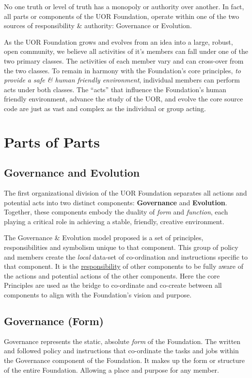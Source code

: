 \documentclass[twocolumn,10pt]{article}
\begin{document}
No one truth or level of truth has a monopoly or authority over another.
In fact, all parts or components of the UOR Foundation, operate within one of the two sources of responsibility \& authority:
Governance or Evolution.

As the UOR Foundation grows and evolves from an idea into a large, robust, open community, we believe all activities of it's members can fall under one of the two primary classes.
The activities of each member vary and can cross-over from the two classes.
To remain in harmony with the Foundation's core principles, \textit{to provide a safe \& human friendly environment}, individual members can perform acts under both classes.
The ``acts'' that influence the Foundation's human friendly environment, advance the study of the UOR, and evolve the core source code are just as vast and complex as the individual or group acting.

\section*{Parts of Parts}
\subsection*{Governance and Evolution}
The first organizational division of the UOR Foundation separates all actions and potential acts into two distinct components: \textbf{Governance} and \textbf{Evolution}.
Together, these components embody the duality of \textit{form} and \textit{function}, each playing a critical role in achieving a stable, friendly, creative environment.

The Governance \& Evolution model proposed is a set of principles, responsibilities and symbolism unique to that component.
This group of policy and members create the \textit{local} data-set of co-ordination and instructions specific to that component.
It is the \underline{responsibility} of other components to be fully aware of the actions and potential actions of the other components.
Here the core Principles are used as the bridge to co-ordinate and co-create between all components to align with the Foundation's vision and purpose.

\subsection*{Governance (Form)}
Governance represents the static, absolute \textit{form} of the Foundation.
The written and followed policy and instructions that co-ordinate the tasks and jobs within the Governance component of the Foundation.
It makes up the form or structure of the entire Foundation.
Allowing a place and purpose for any member.
\end{document}
